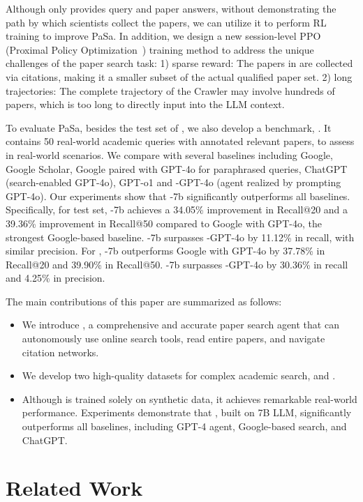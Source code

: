 Although \autoS only provides query and paper answers, without demonstrating the path by which scientists collect the papers, we can utilize it to perform RL training to improve PaSa. In addition, we design a new session-level PPO (Proximal Policy Optimization~\cite{schulman2017proximal}) training method to address the unique challenges of the paper search task: 1) sparse reward: The papers in \autoS are collected via citations, making it a smaller subset of the actual qualified paper set. 2) long trajectories: The complete trajectory of the Crawler may involve hundreds of papers, which is too long to directly input into the LLM context. 

To evaluate PaSa, besides the test set of \autoS, we also develop a benchmark, \realS. It contains 50 real-world academic queries with annotated relevant papers, to assess \pasa in real-world scenarios. We compare \pasa with several baselines including Google, Google Scholar, Google paired with GPT-4o for paraphrased queries, ChatGPT (search-enabled GPT-4o), GPT-o1 and \pasa-GPT-4o (\pasa agent realized by prompting GPT-4o). Our experiments show that \pasa-7b significantly outperforms all baselines. Specifically, for \autoS test set, \pasa-7b achieves a 34.05\% improvement in Recall@20 and a 39.36\% improvement in Recall@50 compared to Google with GPT-4o, the strongest Google-based baseline. \pasa-7b surpasses \pasa-GPT-4o by 11.12\% in recall, with similar precision. For \realS, \pasa-7b outperforms Google with GPT-4o by 37.78\% in Recall@20 and 39.90\% in Recall@50. \pasa-7b surpasses \pasa-GPT-4o by 30.36\% in recall and 4.25\% in precision.

The main contributions of this paper are summarized as follows:
\begin{itemize}
    \item We introduce \pasa, a comprehensive and accurate paper search agent that can autonomously use online search tools, read entire papers, and navigate citation networks.
    \item We develop two high-quality datasets for complex academic search, \autoS and \realS.
    \item Although \pasa is trained solely on synthetic data, it achieves remarkable real-world performance. Experiments demonstrate that \pasa, built on 7B LLM, significantly outperforms all baselines, including GPT-4 agent, Google-based search, and ChatGPT.

\end{itemize}

\section{Related Work}

